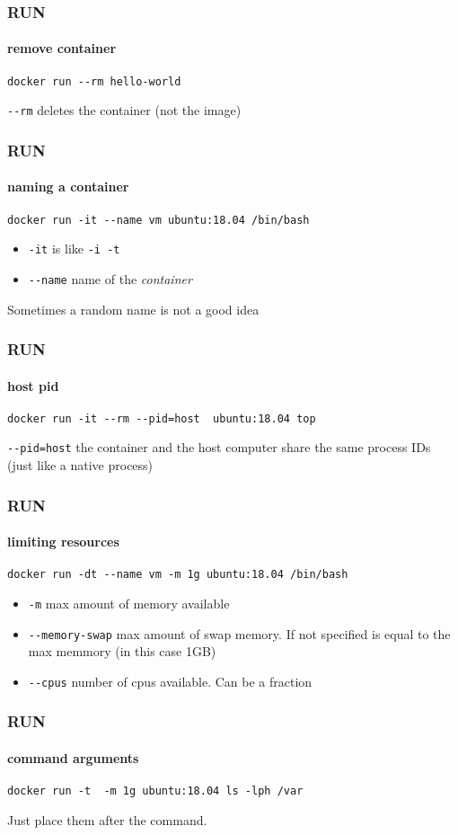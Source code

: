 \begin{frame}[fragile]
\frametitle{RUN}
\framesubtitle{remove container}
\begin{lstlisting}
docker run --rm hello-world
\end{lstlisting}

\lstinline!--rm! deletes the container (not the image)
\end{frame} 
 
\begin{frame}[fragile]
\frametitle{RUN}
\framesubtitle{naming a container}
\begin{lstlisting}
docker run -it --name vm ubuntu:18.04 /bin/bash
\end{lstlisting}

\begin{itemize}
\item \lstinline!-it! is like \lstinline!-i -t!
\item \lstinline!--name! name of the \textit{container}
\end{itemize}
Sometimes a random name is not a good idea
\end{frame}

\begin{frame}[fragile]
\frametitle{RUN}
\framesubtitle{host pid}
\begin{lstlisting}
docker run -it --rm --pid=host  ubuntu:18.04 top
\end{lstlisting}

\lstinline!--pid=host! the container and the host computer share the same process IDs (just like a native process)
\end{frame}

\begin{frame}[fragile]
\frametitle{RUN}
\framesubtitle{limiting resources}
\begin{lstlisting}
docker run -dt --name vm -m 1g ubuntu:18.04 /bin/bash
\end{lstlisting}
\begin{itemize}
\item \lstinline!-m! max amount of memory available
\item \lstinline!--memory-swap! max amount of swap memory. If not specified is equal to the max memmory (in this case 1GB)
\item \lstinline!--cpus! number of cpus available. Can be a fraction
\end{itemize}
\end{frame}

\begin{frame}[fragile]
\frametitle{RUN}
\framesubtitle{command arguments}
\begin{lstlisting}
docker run -t  -m 1g ubuntu:18.04 ls -lph /var
\end{lstlisting}
Just place them after the command.
\end{frame}

